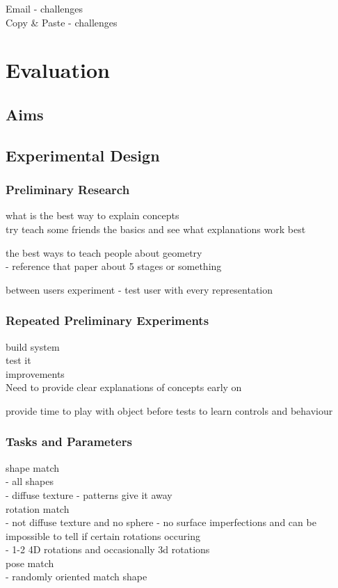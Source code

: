 \documentclass{l4proj}
\begin{document}
Email - challenges\\
Copy \& Paste - challenges

\chapter{Evaluation} 

\section{Aims} 

\section{Experimental Design}

\subsection{Preliminary Research}

what is the best way to explain concepts\\
try teach some friends the basics and see what explanations work best

the best ways to teach people about geometry\\
 - reference that paper about 5 stages or something

between users experiment
 - test user with every representation

\subsection{Repeated Preliminary Experiments}

build system\\
test it\\
improvements\\

Need to provide clear explanations of concepts early on

provide time to play with object before tests to learn controls and behaviour

\subsection{Tasks and Parameters}

shape match\\
 - all shapes\\
 - diffuse texture - patterns give it away\\
rotation match\\
 - not diffuse texture and no sphere - no surface imperfections and can be impossible to tell if certain rotations occuring\\
 - 1-2 4D rotations and occasionally 3d rotations\\
pose match\\
 - randomly oriented match shape
\end{document}
